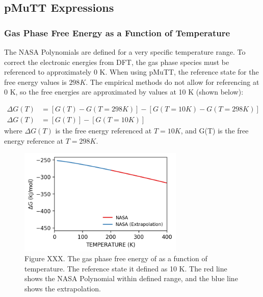 \documentclass[12pt]{article}
\begin{document}
\newpage
\subsection{pMuTT Expressions}


\subsubsection{}



\subsubsection{Gas Phase Free Energy as a Function of Temperature}
The NASA Polynomials are defined for a very specific temperature range. To correct the electronic energies from DFT, the gas phase species must be referenced to approximately 0 K. When using pMuTT, the reference state for the free energy values is $298 K$. The empirical methods do not allow for referencing at 0 K, so the free energies are approximated by values at 10 K (shown below):

\begin{equation}
    \begin{split}
        \Delta G(T) &= [G(T) - G(T=298 K)] - [G(T=10 K) - G(T=298 K)] \\
        \Delta G(T) &= [G(T)] - [G(T=10 K)] 
    \end{split}
\end{equation} 
where $\Delta G(T)$ is the free energy referenced at $T = 10 K$, and G(T) is the free energy reference at $T = 298 K$. 

\begin{figure}[H]
    \centering
    \includegraphics[width=0.70\textwidth]{zi-images/00-General-Graphics/2021-figure-H2-pMuTT.png}
    \caption{Figure XXX. The gas phase free energy of  as a function of temperature. The reference state it defined as 10 K. The red line shows the NASA Polynomial within defined range, and the blue line shows the extrapolation.}
    \label{fig:h2-pmutt-expression}
\end{figure}
\end{document}
